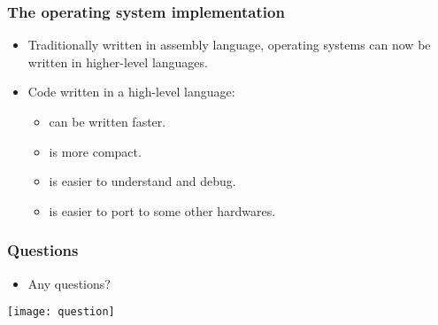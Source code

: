 \documentclass[CJKutf8,xcolor=pdftex,dvipsnames,table]{beamer}
\begin{document}
\begin{CJK*}{UTF8}{song}
  \begin{frame}
    \frametitle{The operating system implementation} \pause
    \begin{itemize}
    \item{Traditionally written in assembly language, operating systems can now be written in higher-level languages.} \pause
    \item{Code written in a high-level language:} \pause
      \begin{itemize}
      \item{can be written faster.} \pause
      \item{is more compact.} \pause
      \item{is easier to understand and debug.} \pause
      \item{is easier to port to some other hardwares.}
      \end{itemize}
    \end{itemize}
  \end{frame}
  
  \begin{frame}
    \frametitle{Questions}
    \begin{itemize}
    \item{Any questions?}
    \end{itemize}
    \begin{center}
      \texttt{[image: question]}
    \end{center}
  \end{frame}
  
\end{CJK*}
\end{document}
